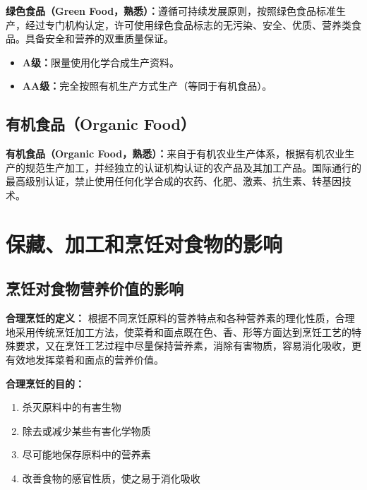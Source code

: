 \begin{tipbox}
\textbf{绿色食品（Green Food，熟悉）：}遵循可持续发展原则，按照绿色食品标准生产，经过专门机构认定，许可使用绿色食品标志的无污染、安全、优质、营养类食品。具备安全和营养的双重质量保证。
\begin{itemize}[leftmargin=*]
    \item \textbf{A级：}限量使用化学合成生产资料。
    \item \textbf{AA级：}完全按照有机生产方式生产（等同于有机食品）。%
\end{itemize}
\end{tipbox}

\subsection{有机食品（Organic Food）}

\begin{tipbox}
\textbf{有机食品（Organic Food，熟悉）：}来自于有机农业生产体系，根据有机农业生产的规范生产加工，并经独立的认证机构认证的农产品及其加工产品。国际通行的最高级别认证，禁止使用任何化学合成的农药、化肥、激素、抗生素、转基因技术。%
\end{tipbox}

\section{保藏、加工和烹饪对食物的影响}

\subsection{烹饪对食物营养价值的影响}

\begin{tipbox}
\textbf{合理烹饪的定义：}%
根据不同烹饪原料的营养特点和各种营养素的理化性质，合理地采用传统烹饪加工方法，使菜肴和面点既在色、香、形等方面达到烹饪工艺的特殊要求，又在烹饪工艺过程中尽量保持营养素，消除有害物质，容易消化吸收，更有效地发挥菜肴和面点的营养价值。

\textbf{合理烹饪的目的：}%
\begin{enumerate}[leftmargin=*]
    \item 杀灭原料中的有害生物
    \item 除去或减少某些有害化学物质
    \item 尽可能地保存原料中的营养素
    \item 改善食物的感官性质，使之易于消化吸收
\end{enumerate}
\end{tipbox}

